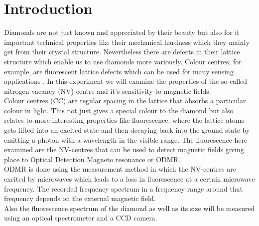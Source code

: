 \section{Introduction}

Diamonds are not just known and appreciated by their beauty but also for it important technical properties like their mechanical hardness which they mainly get from their crystal structure. Nevertheless there are defects in their lattice structure which enable us to use diamonds more variously. Colour centres, for example, are fluorescent lattice defects which can be used for many sensing applications \cite{anleitung}. In this experiment we will examine the properties of the so-called nitrogen vacancy (NV) centre and it's sensitivity to magnetic fields.\\

Colour centres (CC) are  regular spacing in the lattice that absorbs a particular colour in light. This not just gives a special colour to the diamond but also relates to more interesting properties like fluorescence. where the lattice atoms gets lifted into an excited state and then decaying back into the ground state by emitting a photon with a wavelength in the visible range. The fluorescence here examined are the NV-centres that can be used to detect magnetic fields giving place to Optical Detection Magneto resonance or ODMR.\\

ODMR is done using the measurement method in which the NV-centres are excited by microwaves which leads to a loss in fluorescence at a certain microwave frequency. The recorded frequency spectrum in a frequency range around that frequency depends on the external magnetic field.\\

Also the fluorescence spectrum of the diamond as well as its size will be measured using an optical spectrometer and a CCD camera.